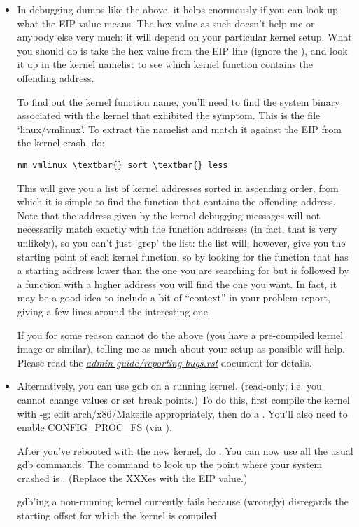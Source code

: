 \documentclass[a4paper,8pt,english]{sphinxmanual}
\begin{document}
\begin{itemize}
\item {} 
In debugging dumps like the above, it helps enormously if you can
look up what the EIP value means.  The hex value as such doesn't help
me or anybody else very much: it will depend on your particular
kernel setup.  What you should do is take the hex value from the EIP
line (ignore the ), and look it up in the kernel namelist to
see which kernel function contains the offending address.

To find out the kernel function name, you'll need to find the system
binary associated with the kernel that exhibited the symptom.  This is
the file `linux/vmlinux'.  To extract the namelist and match it against
the EIP from the kernel crash, do:

\begin{Verbatim}[commandchars=\\\{\}]
nm vmlinux \textbar{} sort \textbar{} less
\end{Verbatim}

This will give you a list of kernel addresses sorted in ascending
order, from which it is simple to find the function that contains the
offending address.  Note that the address given by the kernel
debugging messages will not necessarily match exactly with the
function addresses (in fact, that is very unlikely), so you can't
just `grep' the list: the list will, however, give you the starting
point of each kernel function, so by looking for the function that
has a starting address lower than the one you are searching for but
is followed by a function with a higher address you will find the one
you want.  In fact, it may be a good idea to include a bit of
``context'' in your problem report, giving a few lines around the
interesting one.

If you for some reason cannot do the above (you have a pre-compiled
kernel image or similar), telling me as much about your setup as
possible will help.  Please read the {\hyperref[admin\string-guide/reporting\string-bugs:reportingbugs]{\emph{admin-guide/reporting-bugs.rst}}}
document for details.

\item {} 
Alternatively, you can use gdb on a running kernel. (read-only; i.e. you
cannot change values or set break points.) To do this, first compile the
kernel with -g; edit arch/x86/Makefile appropriately, then do a . You'll also need to enable CONFIG\_PROC\_FS (via ).

After you've rebooted with the new kernel, do .
You can now use all the usual gdb commands. The command to look up the
point where your system crashed is . (Replace the XXXes
with the EIP value.)

gdb'ing a non-running kernel currently fails because  (wrongly)
disregards the starting offset for which the kernel is compiled.

\end{itemize}
\end{document}
